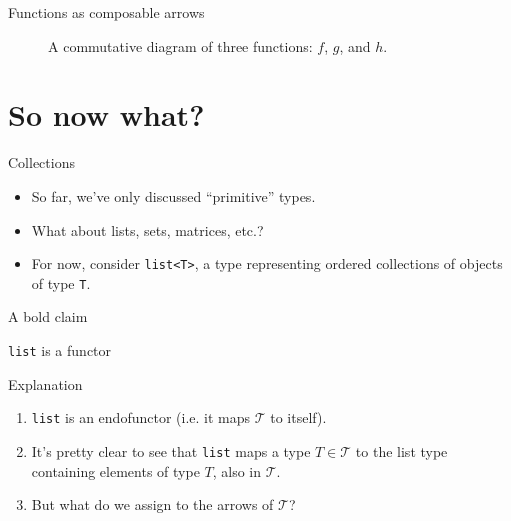 \documentclass[10pt]{beamer}
\begin{document}
\begin{frame}[fragile]{Functions as composable arrows}
  \begin{figure}[H]
    \centering
    \caption{A commutative diagram of three functions: \(f\), \(g\), and \(h\).}
  \end{figure}
\end{frame}

\section{So now what?}

\begin{frame}{Collections}
  \begin{itemize}
  \item So far, we've only discussed ``primitive'' types.
  \item What about lists, sets, matrices, etc.?
  \item For now, consider \texttt{list<T>}, a type representing ordered collections of objects of type \texttt{T}.
  \end{itemize}
\end{frame}

\begin{frame}{A bold claim}
  \begin{center}
    \Huge{\texttt{list} is a functor}
  \end{center}
\end{frame}

\begin{frame}{Explanation}
  \begin{enumerate}
  \item \texttt{list} is an endofunctor (i.e. it maps \(\mathcal{T}\) to itself).
  \item It's pretty clear to see that \texttt{list} maps a type \(T \in \mathcal{T}\) to the list type containing elements of type \(T\), also in \(\mathcal T\).
  \item But what do we assign to the arrows of \(\mathcal T\)?
  \end{enumerate}
\end{frame}
\end{document}

